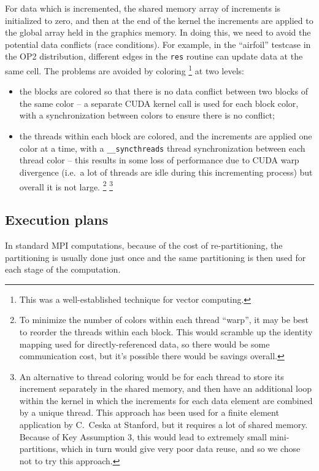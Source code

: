 \documentclass[12pt]{article}
\begin{document}
For data which is incremented, the shared memory array of increments is 
initialized to zero, and then at the end of the kernel the increments are
applied to the global array held in the graphics memory.  In doing this, 
we need to avoid the potential data conflicts (race conditions).  
For example, in the ``airfoil'' testcase in the OP2 distribution, 
different edges in the {\tt res} routine can update data at the same 
cell.  The problems are avoided by coloring
\footnote{This was a well-established technique for vector computing.}
at two levels:
\begin{itemize}
\item
the blocks are colored so that there is no data conflict between two 
blocks of the same color -- a separate CUDA kernel call is used for each
block color, with a synchronization between colors to ensure there is no
conflict;
\item
the threads within each block are colored, and the increments are applied
one color at a time, with a {\tt \_\_syncthreads} thread synchronization
between each thread color -- this results in some loss of performance due
to CUDA warp divergence (i.e.~a lot of threads are idle during this 
incrementing process) but overall it is not large.
\footnote{To minimize the number of colors within each thread ``warp'', 
it may be best to reorder the threads within each block.  This would 
scramble up the identity mapping used for directly-referenced data, 
so there would be some communication cost, but it's possible there would 
be savings overall.}
\footnote{
An alternative to thread coloring would be for each thread to store its
increment separately in the shared memory, and then have an additional loop
within the kernel in which the increments for each data element are combined
by a unique thread.  This approach has been used for a finite element
application by C.~Ceska at Stanford, but it requires a lot of shared memory.
Because of Key Assumption 3, this would lead to extremely small 
mini-partitions, which in turn would give very poor data reuse, and so
we chose not to try this approach.}

\end{itemize}


\subsection{Execution plans}

In standard MPI computations, because of the cost of re-partitioning,
the partitioning is usually done just once and the same partitioning is 
then used for each stage of the computation.
\end{document}
